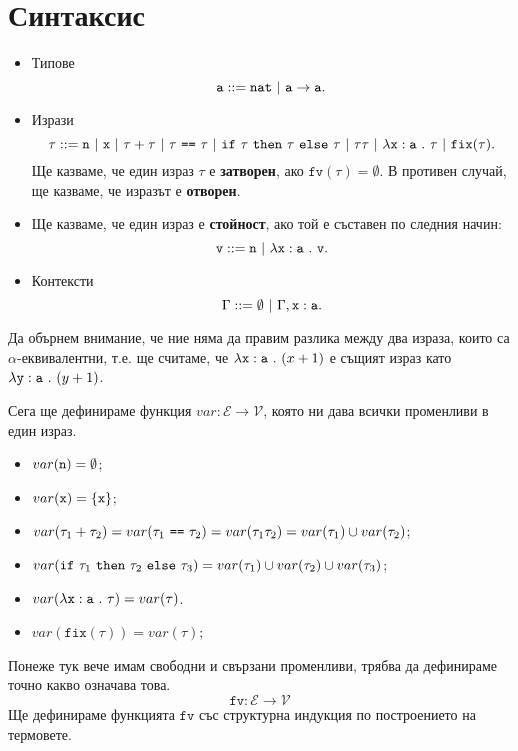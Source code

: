 \section{Синтаксис}

\newcommand{\fix}{\texttt{fix}}
\newcommand{\fv}{\texttt{fv}}

\begin{itemize}
\item
  Типове
  \[\vv{a} ::= \vv{nat}\ |\ \vv{a} \to \vv{a}.\]
\item
  Изрази
  \[\tau ::= \vv{n}\ |\ \vv{x}\ |\ \tau + \tau\ |\ \tau\ \vv{==}\ \tau\ |\ \ifelse{\tau}{\tau}{\tau}\ |\ \tau\tau\ |\ \lamb{x}{a}{\tau}\ |\ \fix(\tau).\]
  Ще казваме, че един израз $\tau$ е {\bf затворен}, ако $\fv(\tau) = \emptyset$.
  В противен случай, ще казваме, че изразът е {\bf отворен}.
\item
  Ще казваме, че един израз е {\bf стойност}, ако той е съставен по следния начин:
  \[\vv{v} ::= \vv{n}\ |\ \lamb{x}{a}{\vv{v}}.\]
\item
  Контексти
  \[\Gamma ::= \emptyset\ |\ \Gamma,\type{x}{a}.\]
\end{itemize}

Да обърнем внимание, че ние няма да правим разлика между два израза, които са $\alpha$-еквивалентни, т.е.
ще считаме, че $\lambda\texttt{x}:\texttt{a}\ .\ {(x+1)}$ е същият израз като $\lambda\texttt{y}:\texttt{a}\ .\ {(y+1)}$.


Сега ще дефинираме функция $var:\mathcal{E} \to \mathcal{V}$, която ни дава всички променливи в един израз.
\begin{itemize}
\item
  $var(\texttt{n}) = \emptyset$;
\item
  $var(\texttt{x}) = \{\texttt{x}\}$;
\item
  $var(\tau_1 + \tau_2) = var(\tau_1\ \vv{==}\ \tau_2) = var(\tau_1\tau_2) = var(\tau_1) \cup var(\tau_2)$;
\item
  $var(\texttt{if}\ \tau_1\ \texttt{then}\ \tau_2\ \texttt{else}\ \tau_3) = var(\tau_1) \cup var(\tau_2) \cup var(\tau_3)$;
\item
  $var(\lambda\texttt{x}:\texttt{a}\ .\ {\tau}) = var(\tau)$.
\item
  $var(\fix(\tau)) = var(\tau)$;
\end{itemize}


Понеже тук вече имам свободни и свързани променливи, трябва да дефинираме точно какво означава това.
\[\fv:\mathcal{E} \to \mathcal{V}\]
Ще дефинираме функцията $\texttt{fv}$ със структурна индукция по построението на термовете.

